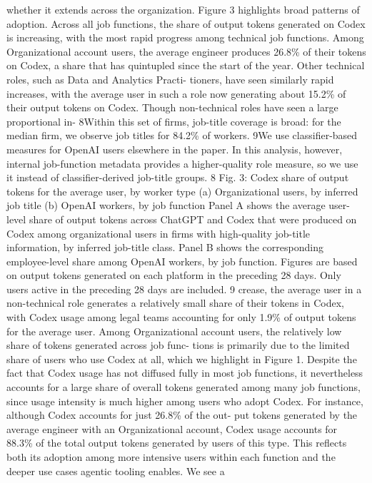whether it extends across the organization.
Figure 3 highlights broad patterns of adoption. Across all job functions, the share of output tokens
generated on Codex is increasing, with the most rapid progress among technical job functions. Among
Organizational account users, the average engineer produces 26.8\% of their tokens on Codex, a share
that has quintupled since the start of the year. Other technical roles, such as Data and Analytics Practi-
tioners, have seen similarly rapid increases, with the average user in such a role now generating about
15.2\% of their output tokens on Codex. Though non-technical roles have seen a large proportional in-
8Within this set of firms, job-title coverage is broad: for the median firm, we observe job titles for 84.2\% of workers.
9We use classifier-based measures for OpenAI users elsewhere in the paper. In this analysis, however, internal job-function
metadata provides a higher-quality role measure, so we use it instead of classifier-derived job-title groups.
8
Fig. 3: Codex share of output tokens for the average user, by worker type
(a) Organizational users, by inferred job title
(b) OpenAI workers, by job function
Panel A shows the average user-level share of output tokens across ChatGPT and Codex that were produced on Codex among
organizational users in firms with high-quality job-title information, by inferred job-title class. Panel B shows the corresponding
employee-level share among OpenAI workers, by job function. Figures are based on output tokens generated on each platform
in the preceding 28 days. Only users active in the preceding 28 days are included.
9
crease, the average user in a non-technical role generates a relatively small share of their tokens in Codex,
with Codex usage among legal teams accounting for only 1.9\% of output tokens for the average user.
Among Organizational account users, the relatively low share of tokens generated across job func-
tions is primarily due to the limited share of users who use Codex at all, which we highlight in Figure 1.
Despite the fact that Codex usage has not diffused fully in most job functions, it nevertheless accounts
for a large share of overall tokens generated among many job functions, since usage intensity is much
higher among users who adopt Codex. For instance, although Codex accounts for just 26.8\% of the out-
put tokens generated by the average engineer with an Organizational account, Codex usage accounts for
88.3\% of the total output tokens generated by users of this type. This reflects both its adoption among
more intensive users within each function and the deeper use cases agentic tooling enables. We see a
